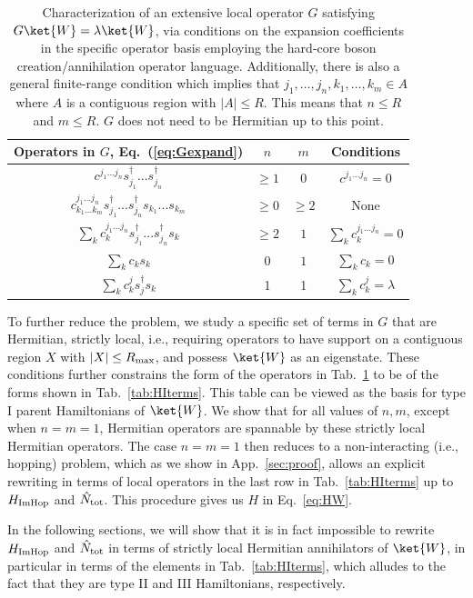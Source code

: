 \documentclass[prx,letterpaper,aps,superscriptaddress,floatfix,twocolumn,nofootinbib]{revtex4-2}
\theoremstyle{definition}
\begin{document}
%
\begin{table}[t]
    \centering
    \begin{tabular}{c|c|c|c}
        Operators in $G$, Eq.~(\ref{eq:Gexpand}) & $n$ & $m$ & Conditions\\\hline
        $c^{j_1...j_n} s_{j_1}^\dag ...s_{j_n}^\dag$ & $\geq 1$ & 0 & $c^{j_1...j_n}=0$\\
        $c^{j_1...j_n}_{k_1...k_m} s_{j_1}^\dag ...s_{j_n}^\dag s_{k_1}...s_{k_m} $ & $\geq 0$ & $\geq 2$ & None\\
        $\sum_k c^{j_1...j_n}_{k} s_{j_1}^\dag ... s_{j_n}^\dag s_{k}$ & $\geq 2$ & $1$ & $\sum_k c^{j_1...j_n}_k=0$ \\
        $\sum_k c_{k}  s_{k} $ & $0$ & $1$ & $\sum_k c_k=0$\\
        $\sum_k c^j_{k}s_j^\dag s_k$ & 1 & 1 & $\sum_{k}c^j_{k}= \lambda$
    \end{tabular}
    \caption{
    Characterization of an extensive local operator $G$ satisfying $G \ket{W} = \lambda \ket{W}$, via conditions on the expansion coefficients in the specific operator basis employing the hard-core boson creation/annihilation operator language.
    Additionally, there is also a general finite-range condition which implies that $j_1, \dots, j_n, k_1, \dots, k_m \in A$ where $A$ is a contiguous region with $|A| \leq R$.
    This means that $n \leq R$ and $m \leq R$.
    $G$ does not need to be Hermitian up to this point.
   }
    \label{tab:Lterms}
%
\end{table}

%
To further reduce the problem, we study a specific set of terms in $G$ that are Hermitian, strictly local, i.e., requiring operators to have support on a contiguous region $X$ with $|X|\leq R_{\rm max}$, and possess $\ket{W}$ as an eigenstate.
%
These conditions further constrains the form of the operators in Tab.~\ref{tab:Lterms} to be of the forms shown in Tab.~\ref{tab:HIterms}.
This table can be viewed as the basis for type I parent Hamiltonians of $\ket{W}$.
%
We show that for all values of $n, m$, except when $n = m = 1$, Hermitian operators are spannable by these strictly local Hermitian operators.
%
The case $n = m = 1$ then reduces to a non-interacting (i.e., hopping) problem, which as we show in App.~\ref{sec:proof}, allows an explicit rewriting in terms of local operators in the last row in Tab.~\ref{tab:HIterms} up to $H_{\rm ImHop}$ and $\hat{N}_{\rm tot}$.
%
This procedure gives us $H$ in Eq.~\eqref{eq:HW}.
%

%
In the following sections, we will show that it is in fact impossible to rewrite $H_{\rm ImHop}$ and $\hat{N}_{\rm tot}$ in terms of strictly local Hermitian annihilators of $\ket{W}$, in particular in terms of the elements in Tab.~\ref{tab:HIterms}, which alludes to the fact that they are type II and III Hamiltonians, respectively.
%
\end{document}
